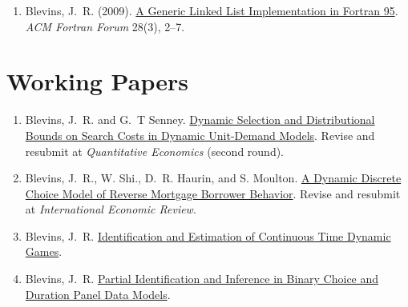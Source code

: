 \documentclass[10pt,letterpaper]{article}
\renewenvironment{itemize}{
  \begin{list}{}{
      \setlength{\leftmargin}{1.5em}
      \setlength{\itemsep}{0.25em}
      \setlength{\parskip}{0pt}
      \setlength{\parsep}{0.25em}
    }
}{
  \end{list}
}
\begin{document}
\begin{enumerate}[resume]
\item Blevins, J.~R. (2009).
  \href{https://jblevins.org/research/generic-list}{A Generic Linked List Implementation in Fortran 95}.
  \textit{ACM Fortran Forum} 28(3), 2--7.
\end{enumerate}

\section*{Working Papers}

\begin{enumerate}[resume]
\item Blevins, J.~R. and G.~T Senney.
  \href{https://jblevins.org/research/dcs}{Dynamic Selection and Distributional Bounds on Search Costs in Dynamic Unit-Demand Models}.
  Revise and resubmit at \textit{Quantitative Economics} (second round).
\item Blevins, J.~R., W. Shi., D.~R. Haurin, and S. Moulton.
  \href{https://jblevins.org/research/ddc-hecm}{A Dynamic Discrete Choice Model of Reverse Mortgage Borrower Behavior}.
  Revise and resubmit at \textit{International Economic Review}.
\item Blevins, J.~R.
  \href{https://jblevins.org/research/ctgames}{Identification and Estimation of Continuous Time Dynamic Games}.
\item Blevins, J.~R.
  \href{https://jblevins.org/research/panel}{Partial Identification and Inference in Binary Choice and Duration Panel Data Models}.
\end{enumerate}



%
\end{document}
